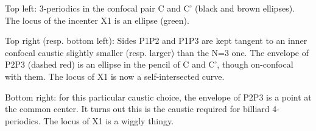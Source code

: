 Top left: 3-periodics in the confocal pair C and C' (black and brown ellipses). The locus of the incenter X1 is an ellipse (green).

Top right (resp. bottom left): Sides P1P2 and P1P3 are kept tangent to an inner confocal caustic slightly smaller (resp. larger) than the N=3 one. The envelope of P2P3 (dashed red) is an ellipse in the pencil of C and C', though on-confocal with them. The locus of X1 is now a self-intersected curve.

Bottom right: for this particular caustic choice, the envelope of P2P3 is a point at the common center. It turns out this is the caustic required for billiard 4-periodics. The locus of X1 is a wiggly thingy.
